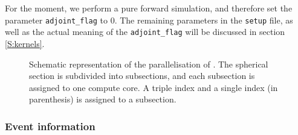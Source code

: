 For the moment, we perform a pure forward simulation, and therefore set the parameter \texttt{adjoint\_flag} to $0$. The remaining parameters in the \texttt{setup} file, as well as the actual meaning of the  \texttt{adjoint\_flag} will be discussed in section \ref{S:kernels}.
\begin{center}
\begin{figure}
\center{} 
\caption{Schematic representation of the parallelisation of \SES. The spherical section is subdivided into subsections, and each subsection is assigned to one compute core. A triple index and a single index (in parenthesis) is assigned to a subsection.}\label{F:parallel}
\end{figure}
\end{center}

\subsubsection{Event information}

